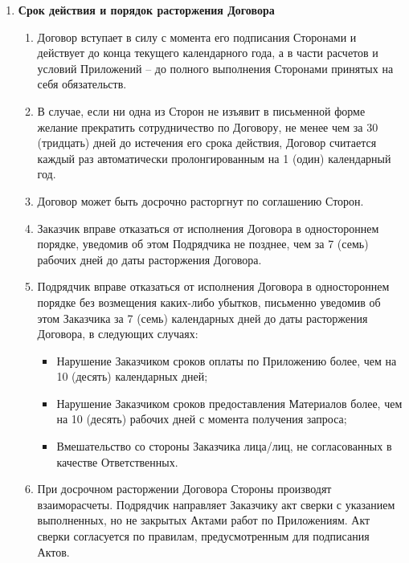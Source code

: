 \documentclass[14pt,a4paper]{article}
\begin{document}
\begin{enumerate}
	\item
	\begin{center}
	\textbf{Срок действия и порядок расторжения Договора}
	\end{center}
	\begin{enumerate}
		\item Договор вступает в силу с момента его подписания Сторонами и действует до конца текущего календарного года, а в части расчетов и условий Приложений – до полного выполнения Сторонами принятых на себя обязательств.

		\item В случае, если ни одна из Сторон не изъявит в письменной форме желание прекратить сотрудничество по Договору, не менее чем за 30 (тридцать) дней до истечения его срока действия, Договор считается каждый раз автоматически пролонгированным на 1 (один) календарный год.

		\item Договор может быть досрочно расторгнут по соглашению Сторон.

		\item Заказчик вправе отказаться от исполнения Договора в одностороннем порядке, уведомив об этом Подрядчика не позднее, чем за 7 (семь) рабочих дней до даты расторжения Договора.

		\item Подрядчик вправе отказаться от исполнения Договора в одностороннем порядке без возмещения каких-либо убытков, письменно уведомив об этом Заказчика за 7 (семь) календарных дней до даты расторжения Договора, в следующих случаях:
		\begin{itemize}
			\item Нарушение Заказчиком сроков оплаты по Приложению более, чем на 10 (десять) календарных дней;

			\item Нарушение Заказчиком сроков предоставления Материалов более, чем на 10 (десять) рабочих дней с момента получения запроса;

			\item Вмешательство со стороны Заказчика лица/лиц, не согласованных в качестве Ответственных.
		\end{itemize}

		\item При досрочном расторжении Договора Стороны производят взаиморасчеты. Подрядчик направляет Заказчику акт сверки с указанием выполненных, но не закрытых Актами работ по Приложениям. Акт сверки согласуется по правилам, предусмотренным для подписания Актов.
	\end{enumerate}


\end{enumerate}
\end{document}
